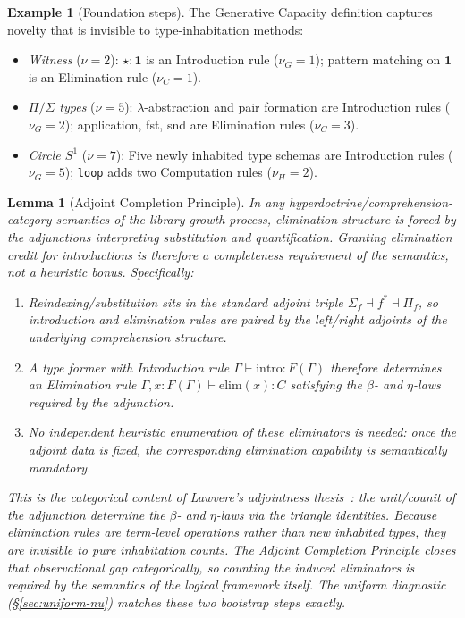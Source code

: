 \documentclass[11pt,a4paper]{article}
\theoremstyle{plain}
\newtheorem{lemma}[theorem]{Lemma}
\theoremstyle{definition}
\newtheorem{example}[theorem]{Example}
\theoremstyle{remark}
\begin{document}
\begin{example}[Foundation steps]
\label{ex:foundation-steps}
The Generative Capacity definition captures novelty that is invisible to type-inhabitation methods:
\begin{itemize}[nosep]
    \item \emph{Witness} ($\nu = 2$): $\star : \mathbf{1}$ is an Introduction rule ($\nu_G = 1$); pattern matching on $\mathbf{1}$ is an Elimination rule ($\nu_C = 1$).
    \item \emph{$\Pi/\Sigma$ types} ($\nu = 5$): $\lambda$-abstraction and pair formation are Introduction rules ($\nu_G = 2$); application, fst, snd are Elimination rules ($\nu_C = 3$).
    \item \emph{Circle $S^1$} ($\nu = 7$): Five newly inhabited type schemas are Introduction rules ($\nu_G = 5$); \texttt{loop} adds two Computation rules ($\nu_H = 2$).
\end{itemize}
\end{example}

\begin{lemma}[Adjoint Completion Principle]
\label{lem:adjoint-completion}
In any hyperdoctrine/comprehension-category semantics of the library growth process, elimination structure is forced by the adjunctions interpreting substitution and quantification.
Granting elimination credit for introductions is therefore a completeness requirement of the semantics, not a heuristic bonus.
\newline
Specifically:
\begin{enumerate}[nosep]
    \item Reindexing/substitution sits in the standard adjoint triple $\Sigma_f \dashv f^* \dashv \Pi_f$, so introduction and elimination rules are paired by the left/right adjoints of the underlying comprehension structure.
    \item A type former with Introduction rule $\Gamma \vdash \mathrm{intro} : F(\Gamma)$ therefore determines an Elimination rule $\Gamma, x : F(\Gamma) \vdash \mathrm{elim}(x) : C$ satisfying the $\beta$- and $\eta$-laws required by the adjunction.
    \item No independent heuristic enumeration of these eliminators is needed: once the adjoint data is fixed, the corresponding elimination capability is semantically mandatory.
\end{enumerate}
This is the categorical content of Lawvere's adjointness thesis~\cite{lawvere-adjoint}: the unit/counit of the adjunction determine the $\beta$- and $\eta$-laws via the triangle identities.
Because elimination rules are term-level operations rather than new inhabited types, they are invisible to pure inhabitation counts.
The Adjoint Completion Principle closes that observational gap categorically, so counting the induced eliminators is required by the semantics of the logical framework itself.
The uniform diagnostic (\S\ref{sec:uniform-nu}) matches these two bootstrap steps exactly.
\end{lemma}
\end{document}
